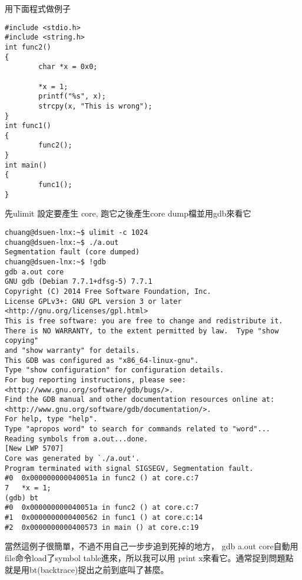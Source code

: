     用下面程式做例子
    \begin{verbatim}
#include <stdio.h>
#include <string.h>
int func2()
{
        char *x = 0x0;

        *x = 1;
        printf("%s", x);
        strcpy(x, "This is wrong");
}
int func1()
{
        func2();
}
int main()
{
        func1();
}
    \end{verbatim}
    先ulimit 設定要產生 core, 跑它之後產生core dump檔並用gdb來看它
    \begin{verbatim}
chuang@dsuen-lnx:~$ ulimit -c 1024
chuang@dsuen-lnx:~$ ./a.out
Segmentation fault (core dumped)
chuang@dsuen-lnx:~$ !gdb
gdb a.out core
GNU gdb (Debian 7.7.1+dfsg-5) 7.7.1
Copyright (C) 2014 Free Software Foundation, Inc.
License GPLv3+: GNU GPL version 3 or later <http://gnu.org/licenses/gpl.html>
This is free software: you are free to change and redistribute it.
There is NO WARRANTY, to the extent permitted by law.  Type "show copying"
and "show warranty" for details.
This GDB was configured as "x86_64-linux-gnu".
Type "show configuration" for configuration details.
For bug reporting instructions, please see:
<http://www.gnu.org/software/gdb/bugs/>.
Find the GDB manual and other documentation resources online at:
<http://www.gnu.org/software/gdb/documentation/>.
For help, type "help".
Type "apropos word" to search for commands related to "word"...
Reading symbols from a.out...done.
[New LWP 5707]
Core was generated by `./a.out'.
Program terminated with signal SIGSEGV, Segmentation fault.
#0  0x000000000040051a in func2 () at core.c:7
7   *x = 1;
(gdb) bt
#0  0x000000000040051a in func2 () at core.c:7
#1  0x0000000000400562 in func1 () at core.c:14
#2  0x0000000000400573 in main () at core.c:19
    \end{verbatim}
    當然這例子很簡單，不過不用自己一步步追到死掉的地方，
    gdb a.out core自動用file命令load了symbol table進來，所以我可以用
    print x來看它。通常捉到問題點就是用bt(backtrace)捉出之前到底叫了甚麼。

